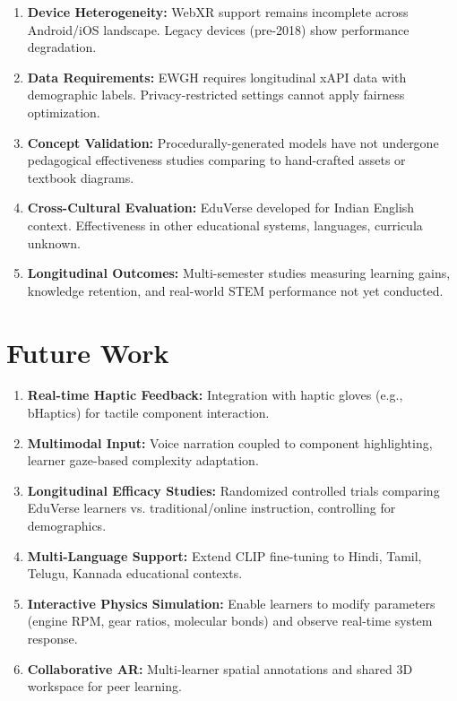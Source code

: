 \documentclass[conference]{IEEEtran}
\begin{document}
\begin{enumerate}
    \item \textbf{Device Heterogeneity:} WebXR support remains incomplete across Android/iOS landscape. Legacy devices (pre-2018) show performance degradation.
    
    \item \textbf{Data Requirements:} EWGH requires longitudinal xAPI data with demographic labels. Privacy-restricted settings cannot apply fairness optimization.
    
    \item \textbf{Concept Validation:} Procedurally-generated models have not undergone pedagogical effectiveness studies comparing to hand-crafted assets or textbook diagrams.
    
    \item \textbf{Cross-Cultural Evaluation:} EduVerse developed for Indian English context. Effectiveness in other educational systems, languages, curricula unknown.
    
    \item \textbf{Longitudinal Outcomes:} Multi-semester studies measuring learning gains, knowledge retention, and real-world STEM performance not yet conducted.
\end{enumerate}

\section{Future Work}

\begin{enumerate}
    \item \textbf{Real-time Haptic Feedback:} Integration with haptic gloves (e.g., bHaptics) for tactile component interaction.
    
    \item \textbf{Multimodal Input:} Voice narration coupled to component highlighting, learner gaze-based complexity adaptation.
    
    \item \textbf{Longitudinal Efficacy Studies:} Randomized controlled trials comparing EduVerse learners vs. traditional/online instruction, controlling for demographics.
    
    \item \textbf{Multi-Language Support:} Extend CLIP fine-tuning to Hindi, Tamil, Telugu, Kannada educational contexts.
    
    \item \textbf{Interactive Physics Simulation:} Enable learners to modify parameters (engine RPM, gear ratios, molecular bonds) and observe real-time system response.
    
    \item \textbf{Collaborative AR:} Multi-learner spatial annotations and shared 3D workspace for peer learning.
\end{enumerate}
\end{document}
